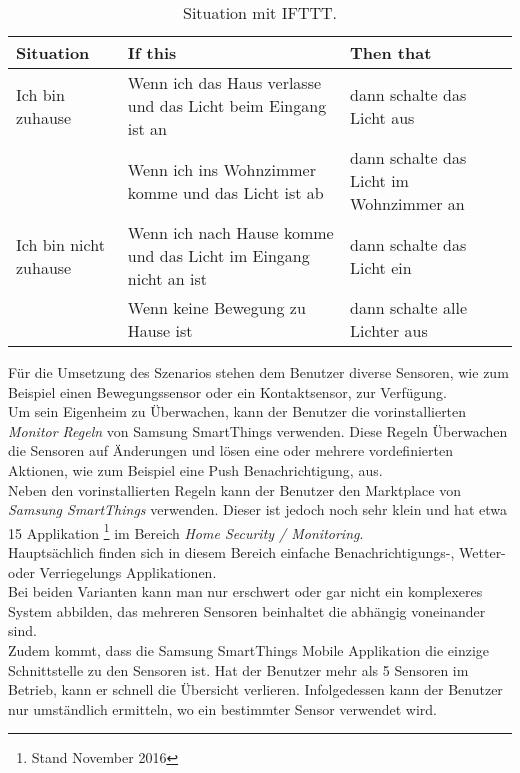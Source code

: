 \begin{center}
  \begin{table}[ht]
    \begin{tabular}{p{3cm} | p{6cm} | p{6cm}}  
      \textbf{Situation} & \textbf{If this} & \textbf{Then that} \\
      \hline
      Ich bin zuhause & 
           Wenn ich das Haus verlasse und das Licht beim Eingang ist an & 
           dann schalte das Licht aus\\ \cline{2-3}
      & Wenn ich ins Wohnzimmer komme und das Licht ist ab & 
           dann schalte das Licht im Wohnzimmer an\\
      \hline
      Ich bin nicht zuhause  & 
           Wenn ich nach Hause komme und das Licht im Eingang nicht an ist &
           dann schalte das Licht ein\\ \cline{2-3}
      & Wenn keine Bewegung zu Hause ist & 
           dann schalte alle Lichter aus\\
      \hline
    \end{tabular}
    \caption{\label{tab:situation_ifttt}Situation mit IFTTT.}
  \end{table}
\end{center}



Für die Umsetzung des Szenarios stehen dem Benutzer diverse Sensoren, wie zum Beispiel einen Bewegungssensor oder ein Kontaktsensor, zur Verfügung.\\
Um sein Eigenheim zu Überwachen, kann der Benutzer die vorinstallierten \textit{Monitor Regeln} von Samsung SmartThings verwenden. Diese Regeln Überwachen die Sensoren auf Änderungen und lösen eine oder mehrere vordefinierten Aktionen, wie zum Beispiel eine Push Benachrichtigung, aus.\\
Neben den vorinstallierten Regeln kann der Benutzer den Marktplace von \textit{Samsung SmartThings} verwenden. Dieser ist jedoch noch sehr klein und hat etwa 15 Applikation \footnote{Stand November 2016} im Bereich \textit{Home Security / Monitoring}.\\
Hauptsächlich finden sich in diesem Bereich einfache Benachrichtigungs-, Wetter- oder Verriegelungs Applikationen.\\
Bei beiden Varianten kann man nur erschwert oder gar nicht ein komplexeres System abbilden, das mehreren Sensoren beinhaltet die abhängig voneinander sind.\\[2ex]
%
Zudem kommt, dass die Samsung SmartThings Mobile Applikation die einzige Schnittstelle zu den Sensoren ist.
Hat der Benutzer mehr als 5 Sensoren im Betrieb, kann er schnell die Übersicht verlieren. Infolgedessen kann der Benutzer nur umständlich ermitteln, wo ein bestimmter Sensor verwendet wird.\\[2ex]


